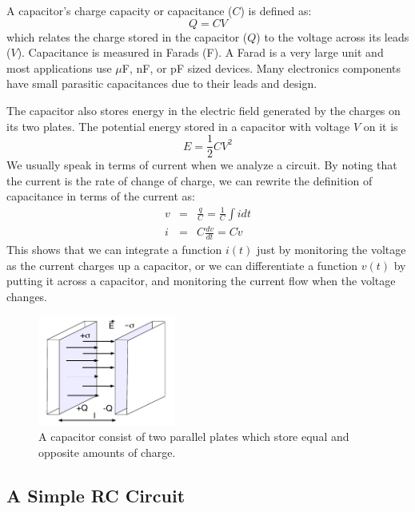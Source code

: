 \documentclass{article}
\begin{document}
A capacitor's charge capacity or capacitance ($C$) is defined as:
\begin{equation}
 Q = C V
\end{equation}
which relates the charge stored in the capacitor ($Q$) to the voltage across its leads ($V$). Capacitance is measured in Farads (F). A Farad is a very large unit and most applications use $\mu$F, nF, or pF sized devices. Many electronics components have small parasitic capacitances due to their leads and design.

The capacitor also stores energy in the electric field generated by the charges on its two plates. The potential energy stored in a capacitor with voltage $V$ on it is
\begin{equation}
 E = \frac{1}{2} C V^2
\end{equation}
We usually speak in terms of current when we analyze a circuit. By noting that the current is the rate of change of charge, we can rewrite the definition of capacitance in terms of the current as:
\begin{eqnarray}
v & = & \frac{q}{C} = \frac{1}{C} \int i dt \\
i & = & C \frac{dv}{dt} = C \dot{v}
\end{eqnarray}
This shows that we can integrate a function $i(t)$ just by monitoring the voltage as the current charges up a capacitor, or we can differentiate a function $v(t)$ by putting it across a capacitor, and monitoring the current flow when the voltage changes.

\begin{figure}
\begin{center}
\includegraphics[width=0.4\textwidth]{pics/capacitor}
\end{center}
\caption{ A capacitor consist of two parallel plates which store equal and opposite amounts of charge.}
\label{fig:capacitor}
\end{figure}

\subsection{A Simple RC Circuit}
\end{document}
